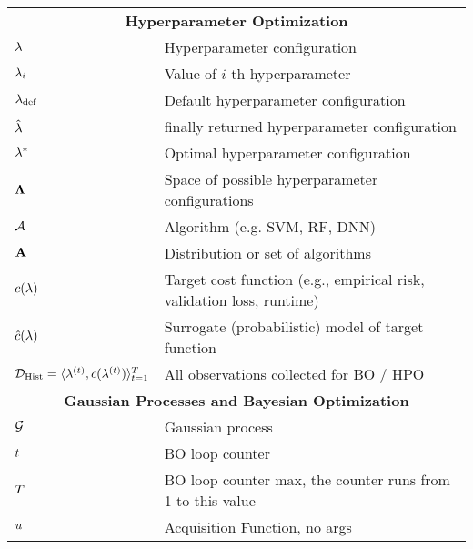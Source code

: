 \documentclass[]{report}
\begin{document}
\begin{table}
\begin{tabular}{ll}
		\midrule
		\multicolumn{2}{c}{\textbf{Hyperparameter Optimization}}\\
		$\mathbf{\lambda}$ & Hyperparameter configuration\\
		$\mathbf{\lambda}_i$ & Value of $i$-th hyperparameter \\
		$\mathbf{\lambda}_{\text{def}}$ & Default hyperparameter configuration\\
		$\hat{\mathbf{\lambda}}$ & finally returned hyperparameter configuration\\
		$\mathbf{\lambda}^*$ & Optimal hyperparameter configuration\\
		$\mathbf{\Lambda}$ &  Space of possible hyperparameter configurations\\
		$\mathcal{A}$ & Algorithm (e.g. SVM, RF, DNN) \\
		$\mathbf{A}$ & Distribution or set of algorithms\\
		$c(\mathbf{\lambda})$ & Target cost function (e.g., empirical risk, validation loss, runtime)\\
		$\hat{c}(\mathbf{\lambda})$ & Surrogate (probabilistic) model of target function\\
		$\mathcal{D}_{\text{Hist}} = \langle \mathbf{\lambda}^{(t)}, c(\mathbf{\lambda}^{(t)}) \rangle_{t=1}^T$ &  All observations collected for BO / HPO\\
		\midrule
		\multicolumn{2}{c}{\textbf{Gaussian Processes and Bayesian Optimization}}\\
		 $\mathcal{G}$ & Gaussian process \\
		$t$ & BO loop counter \\
		$T$ & BO loop counter max, the counter runs from 1 to this value \\
		$u$ & Acquisition Function, no args \\

\end{tabular}
\end{table}
\end{document}
